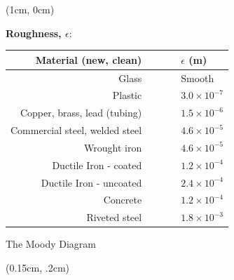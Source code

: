 \documentclass[9pt,xcolor={svgnames, x11names},professionalfonts]{beamer}
\begin{document}
\begin{frame}
	
	
	\begin{textblock*}{1\columnwidth}(1cm, 0cm)
		\begin{center}
			\textbf{Roughness, $\epsilon$}:
			\parb
			\begin{tabular}{rrl}
				\toprule
				Material (new, clean)          & $\qquad$ & $\epsilon$ (m)     \\
				\midrule
				\midrule
				Glass                          &          & Smooth             \\
				\midrule
				Plastic                        &          & $3.0\times10^{-7}$ \\
				\midrule
				Copper, brass, lead (tubing)   &          & $1.5\times10^{-6}$ \\
				\midrule
				Commercial steel, welded steel &          & $4.6\times10^{-5}$ \\
				\midrule
				Wrought iron                   &          & $4.6\times10^{-5}$ \\
				\midrule
				Ductile Iron - coated          &          & $1.2\times10^{-4}$ \\
				\midrule
				Ductile Iron - uncoated        &          & $2.4\times10^{-4}$ \\
				\midrule
				Concrete                       &          & $1.2\times10^{-4}$ \\
				\midrule
				Riveted steel                  &          & $1.8\times10^{-3}$ \\
				\midrule
				\bottomrule
			\end{tabular}
			\par
		\end{center}
	\end{textblock*}
	
\end{frame}

\begin{frame}{The Moody Diagram}
	\begin{textblock*}{1\columnwidth}(0.15cm, .2cm)
		
	\end{textblock*}
\end{frame}
\end{document}
